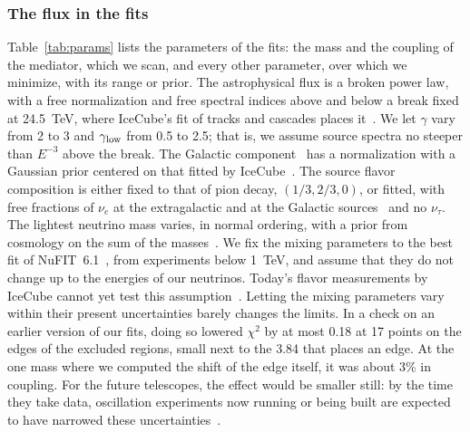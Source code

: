 \documentclass[linenumbers, aps, prd, twocolumn, superscriptaddress, floatfix, longbibliography, nofootinbib, bibnotes]{revtex4-2}
\begin{document}
\subsubsection{The flux in the fits}
Table~\ref{tab:params} lists the parameters of the fits: the mass and the coupling of the mediator, which we scan, and every other parameter, over which we minimize, with its range or prior.
The astrophysical flux is a broken power law, with a free normalization and free spectral indices above and below a break fixed at 24.5~TeV, where IceCube's fit of tracks and cascades places it~\cite{IceCube:2025tgp, IceCube:2025ewu}.
We let $\gamma$ vary from 2 to 3 and $\gamma_{\rm low}$ from 0.5 to 2.5; that is, we assume source spectra no steeper than $E^{-3}$ above the break.
The Galactic component~\cite{Schwefer:2022zly} has a normalization with a Gaussian prior centered on that fitted by IceCube~\cite{IceCube:2026plr}.
The source flavor composition is either fixed to that of pion decay, $(1/3, 2/3, 0)$, or fitted, with free fractions of $\nu_e$ at the extragalactic and at the Galactic sources~\cite{Bustamante:2026knw} and no $\nu_\tau$.
The lightest neutrino mass varies, in normal ordering, with a prior from cosmology on the sum of the masses~\cite{Planck:2018vyg}.
We fix the mixing parameters to the best fit of NuFIT~6.1~\cite{Esteban:2024eli, NuFIT61}, from experiments below 1~TeV, and assume that they do not change up to the energies of our neutrinos.
Today's flavor measurements by IceCube cannot yet test this assumption~\cite{Bustamante:2026aur, Bustamante:2026zst}.
Letting the mixing parameters vary within their present uncertainties barely changes the limits.
In a check on an earlier version of our fits, doing so lowered $\chi^2$ by at most 0.18 at 17 points on the edges of the excluded regions, small next to the 3.84 that places an edge.
At the one mass where we computed the shift of the edge itself, it was about 3\% in coupling.
For the future telescopes, the effect would be smaller still: by the time they take data, oscillation experiments now running or being built are expected to have narrowed these uncertainties~\cite{Song:2020nfh}.
\end{document}
